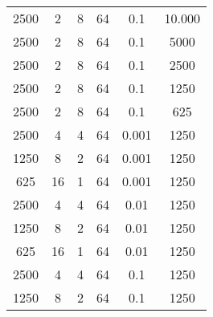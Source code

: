 \begin{tabularx}{\linewidth}{ |c|c|c|c|c|c|  }
    2500 & 2   & 8     & 64  & 0.1   & 10.000                                                                                                                             \\
    2500 & 2   & 8     & 64  & 0.1   & 5000                                                                                                                               \\
    2500 & 2   & 8     & 64  & 0.1   & 2500                                                                                                                               \\
    2500 & 2   & 8     & 64  & 0.1   & 1250                                                                                                                               \\
    2500 & 2   & 8     & 64  & 0.1   & 625                                                                                                                                \\
    2500 & 4   & 4     & 64  & 0.001 & 1250                                                                                                                               \\
    1250 & 8   & 2     & 64  & 0.001 & 1250                                                                                                                               \\
    625  & 16  & 1     & 64  & 0.001 & 1250                                                                                                                               \\
    2500 & 4   & 4     & 64  & 0.01  & 1250                                                                                                                               \\
    1250 & 8   & 2     & 64  & 0.01  & 1250                                                                                                                               \\
    625  & 16  & 1     & 64  & 0.01  & 1250                                                                                                                               \\
    2500 & 4   & 4     & 64  & 0.1   & 1250                                                                                                                               \\
    1250 & 8   & 2     & 64  & 0.1   & 1250                                                                                                                               \\

\end{tabularx}
